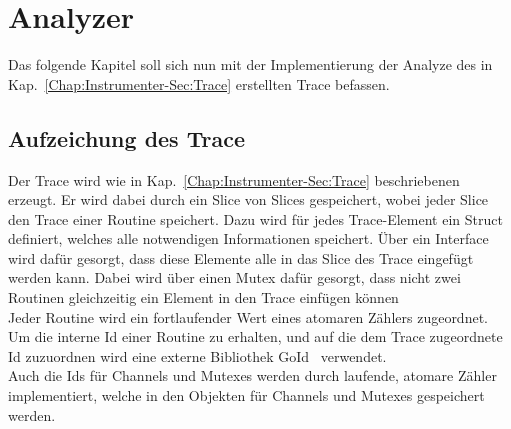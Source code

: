 
\chapter{Analyzer} \label{Chap:Implement}

Das folgende Kapitel soll sich nun mit der Implementierung der Analyze des in 
Kap.~\ref{Chap:Instrumenter-Sec:Trace} erstellten 
Trace befassen.

\section{Aufzeichung des Trace}
Der Trace wird wie in Kap.~\ref{Chap:Instrumenter-Sec:Trace}
beschriebenen erzeugt. Er wird dabei durch ein Slice von Slices 
gespeichert, wobei jeder Slice den Trace einer Routine 
speichert. Dazu wird für jedes Trace-Element ein Struct definiert, 
welches alle notwendigen Informationen speichert. Über ein Interface 
wird dafür gesorgt, dass diese Elemente alle in das Slice des Trace eingefügt
werden kann. Dabei wird über einen Mutex dafür gesorgt, dass nicht 
zwei Routinen gleichzeitig ein Element in den Trace einfügen können\\
Jeder Routine wird ein fortlaufender Wert eines atomaren Zählers zugeordnet. 
Um die interne Id einer Routine zu erhalten, und auf die dem Trace zugeordnete 
Id zuzuordnen wird eine externe Bibliothek GoId~\cite{goid} verwendet.\\
Auch die Ids für Channels und Mutexes werden durch laufende, atomare Zähler 
implementiert, welche in den Objekten für Channels und Mutexes gespeichert werden.


